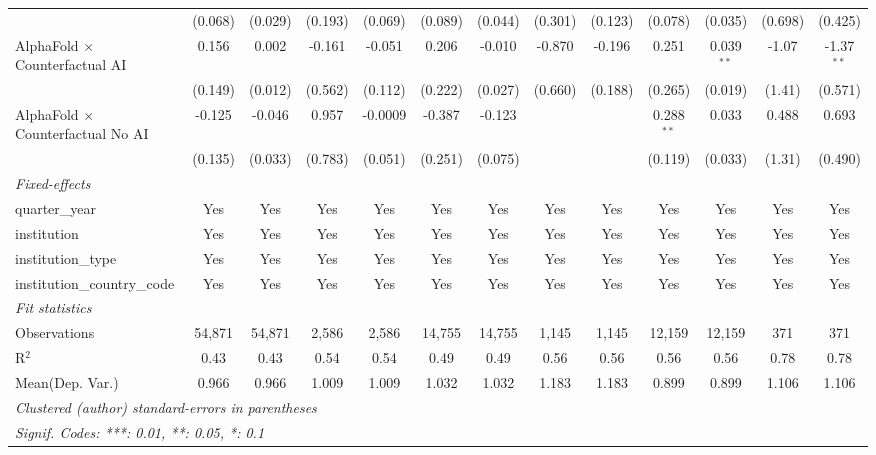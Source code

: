 \begin{tabular}{lcccccccccccc}
                                            & (0.068) & (0.029) & (0.193) & (0.069)     & (0.089) & (0.044) & (0.301)      & (0.123)       & (0.078)       & (0.035)      & (0.698)       & (0.425)\\   
   AlphaFold $\times$ Counterfactual AI     & 0.156   & 0.002   & -0.161  & -0.051      & 0.206   & -0.010  & -0.870       & -0.196        & 0.251         & 0.039$^{**}$ & -1.07         & -1.37$^{**}$\\   
                                            & (0.149) & (0.012) & (0.562) & (0.112)     & (0.222) & (0.027) & (0.660)      & (0.188)       & (0.265)       & (0.019)      & (1.41)        & (0.571)\\   
   AlphaFold $\times$ Counterfactual No AI  & -0.125  & -0.046  & 0.957   & -0.0009     & -0.387  & -0.123  &              &               & 0.288$^{**}$  & 0.033        & 0.488         & 0.693\\   
                                            & (0.135) & (0.033) & (0.783) & (0.051)     & (0.251) & (0.075) &              &               & (0.119)       & (0.033)      & (1.31)        & (0.490)\\   
   \midrule
   \emph{Fixed-effects}\\
   quarter\_year                            & Yes     & Yes     & Yes     & Yes         & Yes     & Yes     & Yes          & Yes           & Yes           & Yes          & Yes           & Yes\\  
   institution                              & Yes     & Yes     & Yes     & Yes         & Yes     & Yes     & Yes          & Yes           & Yes           & Yes          & Yes           & Yes\\  
   institution\_type                        & Yes     & Yes     & Yes     & Yes         & Yes     & Yes     & Yes          & Yes           & Yes           & Yes          & Yes           & Yes\\  
   institution\_country\_code               & Yes     & Yes     & Yes     & Yes         & Yes     & Yes     & Yes          & Yes           & Yes           & Yes          & Yes           & Yes\\  
   \midrule
   \emph{Fit statistics}\\
   Observations                             & 54,871  & 54,871  & 2,586   & 2,586       & 14,755  & 14,755  & 1,145        & 1,145         & 12,159        & 12,159       & 371           & 371\\  
   R$^2$                                    & 0.43    & 0.43    & 0.54    & 0.54        & 0.49    & 0.49    & 0.56         & 0.56          & 0.56          & 0.56         & 0.78          & 0.78\\  
Mean(Dep. Var.) & 0.966 & 0.966 & 1.009 & 1.009 & 1.032 & 1.032 & 1.183 & 1.183 & 0.899 & 0.899 & 1.106 & 1.106 \\
   \midrule \midrule
   \multicolumn{13}{l}{\emph{Clustered (author) standard-errors in parentheses}}\\
   \multicolumn{13}{l}{\emph{Signif. Codes: ***: 0.01, **: 0.05, *: 0.1}}\\
\end{tabular}
\par\endgroup
